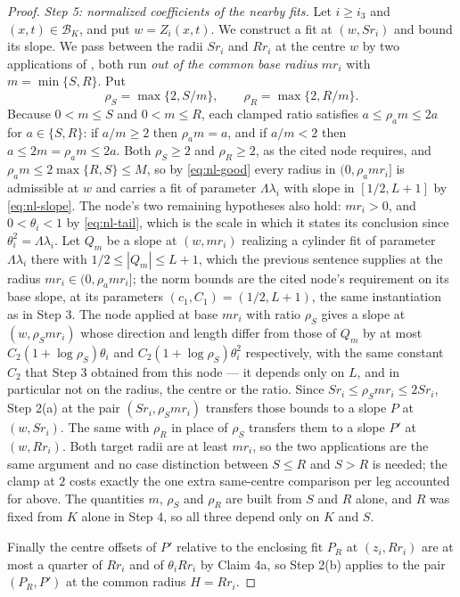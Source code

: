 \begin{proof}
\emph{Step 5: normalized coefficients of the nearby fits.}
Let $i\ge i_3$ and $(x,t)\in\mathcal B_K$, and put $w=Z_i(x,t)$. We construct a
fit at $(w,Sr_i)$ and bound its slope. We pass between the radii $Sr_i$ and $Rr_i$
at the centre $w$ by two applications of
, both run \emph{out of the common base radius}
$mr_i$ with $m=\min\{S,R\}$. Put
\[
  \rho_S=\max\{2,S/m\},\qquad \rho_R=\max\{2,R/m\} .
\]
Because $0<m\le S$ and $0<m\le R$, each clamped ratio satisfies
$a\le\rho_a m\le2a$ for $a\in\{S,R\}$: if $a/m\ge2$ then $\rho_am=a$, and if
$a/m<2$ then $a\le 2m=\rho_am\le2a$. Both $\rho_S\ge2$ and $\rho_R\ge2$, as the
cited node requires, and $\rho_am\le2\max\{R,S\}\le M$, so by \eqref{eq:nl-good}
every radius in $(0,\rho_amr_i]$ is admissible at $w$ and carries a fit of
parameter $\Lambda\lambda_i$ with slope in $[1/2,L+1]$ by \eqref{eq:nl-slope}. The
node's two remaining hypotheses also hold: $mr_i>0$, and $0<\theta_i<1$ by
\eqref{eq:nl-tail}, which is the scale in which it states its conclusion since
$\theta_i^2=\Lambda\lambda_i$. Let $Q_m$ be a slope at $(w,mr_i)$ realizing a cylinder fit of parameter
$\Lambda\lambda_i$ there with $1/2\le|Q_m|\le L+1$, which the previous sentence
supplies at the radius $mr_i\in(0,\rho_amr_i]$; the norm bounds are the cited node's
requirement on its base slope, at its parameters $(c_1,C_1)=(1/2,L+1)$, the same
instantiation as in Step 3. The node applied at base $mr_i$ with ratio $\rho_S$ gives
a slope at $(w,\rho_Smr_i)$ whose direction and length differ from those of $Q_m$ by
at most $C_2(1+\log\rho_S)\theta_i$ and $C_2(1+\log\rho_S)\theta_i^2$ respectively,
with the same constant $C_2$ that Step 3 obtained from this node --- it depends only
on $L$, and in particular not on the radius, the centre or the ratio. Since
$Sr_i\le\rho_Smr_i\le2Sr_i$, Step 2(a) at the pair $(Sr_i,\rho_Smr_i)$ transfers
those bounds to a slope $P$ at $(w,Sr_i)$. The same with $\rho_R$ in place of
$\rho_S$ transfers them to a slope $P'$ at $(w,Rr_i)$. Both target radii are at
least $mr_i$, so the two applications are the same argument and no case distinction
between $S\le R$ and $S>R$ is needed; the clamp at $2$ costs exactly the one extra
same-centre comparison per leg accounted for above. The quantities $m$, $\rho_S$ and
$\rho_R$ are built from $S$ and $R$ alone, and $R$ was fixed from $K$ alone in
Step 4, so all three depend only on $K$ and $S$.

Finally the centre offsets of $P'$ relative to the enclosing fit $P_R$ at
$(z_i,Rr_i)$ are at most a quarter of $Rr_i$ and of $\theta_iRr_i$ by Claim 4a, so
Step 2(b) applies to the pair $(P_R,P')$ at the common radius $H=Rr_i$.


\end{proof}

